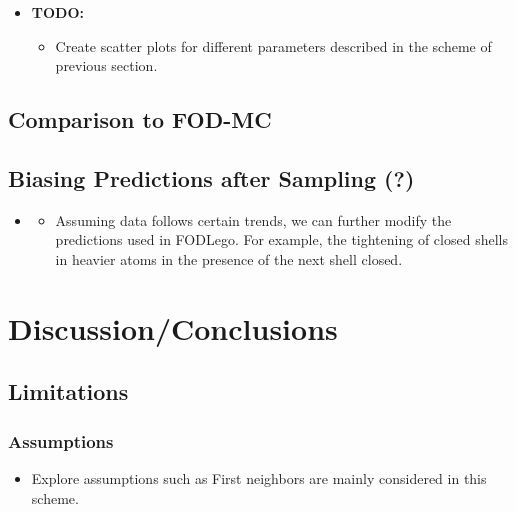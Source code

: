 \documentclass[12pt,a4paper,]{report}
\providecommand{\tightlist}{%
  \setlength{\itemsep}{0pt}\setlength{\parskip}{0pt}}
\begin{document}
\begin{itemize}
\tightlist
\item
  \textbf{TODO:}

  \begin{itemize}
  \tightlist
  \item
    Create scatter plots for different parameters described in the
    scheme of previous section.
  \end{itemize}
\end{itemize}

\section{Comparison to FOD-MC}\label{comparison-to-fod-mc}

\section{Biasing Predictions after Sampling
(?)}\label{biasing-predictions-after-sampling}

\begin{itemize}
\item
  \begin{itemize}
  \tightlist
  \item
    Assuming data follows certain trends, we can further modify the
    predictions used in FODLego. For example, the tightening of closed
    shells in heavier atoms in the presence of the next shell closed.
  \end{itemize}
\end{itemize}

\chapter{Discussion/Conclusions}\label{discussionconclusions}

\section{Limitations}\label{limitations}

\subsection{Assumptions}\label{assumptions}

\begin{itemize}
\tightlist
\item
  Explore assumptions such as First neighbors are mainly considered in
  this scheme.
\end{itemize}
\end{document}
